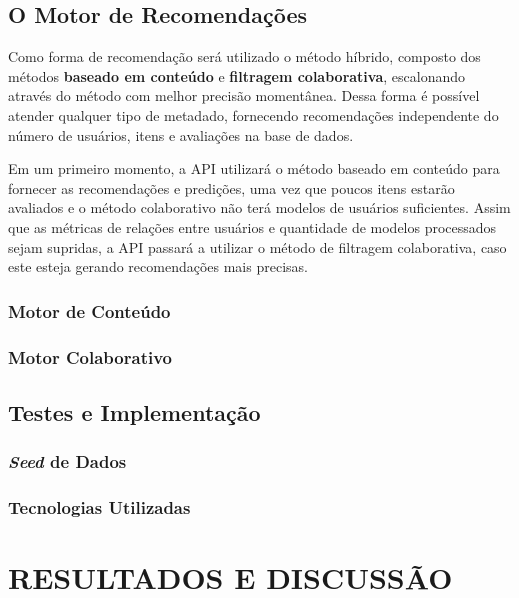 \documentclass[12pt, openright, oneside, a4paper, brazil]{abntex2}
\begin{document}
\section{O Motor de Recomendações} \label{motor}

Como forma de recomendação será utilizado o método híbrido, composto dos métodos \textbf{baseado em conteúdo} e \textbf{filtragem colaborativa}, escalonando através do método com melhor precisão momentânea. Dessa forma é possível atender qualquer tipo de metadado, fornecendo recomendações independente do número de usuários, itens e avaliações na base de dados.

Em um primeiro momento, a API utilizará o método baseado em conteúdo para fornecer as recomendações e predições, uma vez que poucos itens estarão avaliados e o método colaborativo não terá modelos de usuários suficientes. Assim que as métricas de relações entre usuários e quantidade de modelos processados sejam supridas, a API passará a utilizar o método de filtragem colaborativa, caso este esteja gerando recomendações mais precisas.

\subsection{Motor de Conteúdo} \label{motor:conteudo}

\subsection{Motor Colaborativo} \label{motor:colaborativo}

\section{Testes e Implementação} \label{testes}

\subsection{\textit{Seed} de Dados}

\subsection{Tecnologias Utilizadas} \label{tecnologias}

%
%

\chapter{RESULTADOS E DISCUSSÃO}
\end{document}
